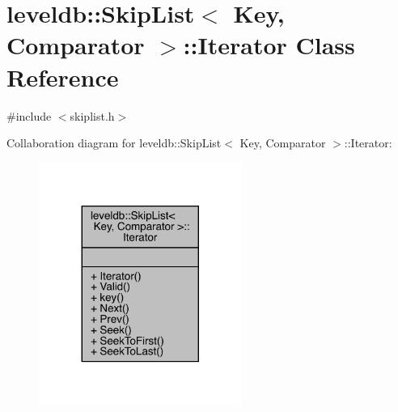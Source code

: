 \hypertarget{classleveldb_1_1_skip_list_1_1_iterator}{}\section{leveldb\+::Skip\+List$<$ Key, Comparator $>$\+::Iterator Class Reference}
\label{classleveldb_1_1_skip_list_1_1_iterator}


{\ttfamily \#include $<$skiplist.\+h$>$}



Collaboration diagram for leveldb\+::Skip\+List$<$ Key, Comparator $>$\+::Iterator\+:
\nopagebreak
\begin{figure}[H]
\begin{center}
\leavevmode
\includegraphics[width=188pt]{classleveldb_1_1_skip_list_1_1_iterator__coll__graph}
\end{center}
\end{figure}
